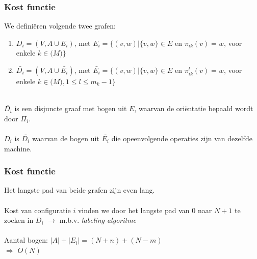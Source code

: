 \documentclass
   [kulak] %
   {kulakbeamer}
\newcommand\tab[1][1cm]{\hspace*{#1}}
\begin{document}
\begin{frame}
	\frametitle{Kost functie}
	We definiëren volgende twee grafen:\\
	\begin{enumerate}
		\item $D_i = (V, A \cup E_i)$, met $E_i = \{(v, w) | \{v, w\} \in E$ en 		$\pi_{ik}(v) = w$, voor enkele $k \in \mathscr(M)\}$\\
		\item $\bar{D_i} = (V, A \cup \bar{E_i})$, met $\bar{E_i} = \{(v, w) | \{v, w\} \in E$ en $\pi_{ik}^l(v) = w$, voor enkele $k \in \mathscr(M), 1 \le l \le m_k -1\}$
	\end{enumerate}
	~\\
	
	$\bar{D_i}$ is een disjuncte graaf met bogen uit $E$, waarvan de oriëntatie bepaald wordt door $\Pi_i$.\\ ~\\

	$D_i$ is $\bar{D_i}$ waarvan de bogen uit $\bar{E_i}$ die opeenvolgende operaties zijn van dezelfde machine.
	
	
\end{frame}

\begin{frame}
\frametitle{Kost functie}
	Het langste pad van beide grafen zijn even lang.\\~\\
	
	Kost van configuratie $i$ vinden we door het langste pad van $0$ naar $N + 1$ te zoeken in $D_i$ $\rightarrow$ m.b.v. \textit{labeling algoritme}\\~\\
	
	Aantal bogen: $|A| + |E_i| = (N + n) + (N - m)$ \\
	\tab $\Rightarrow$ $O(N)$


\end{frame}
\end{document}
